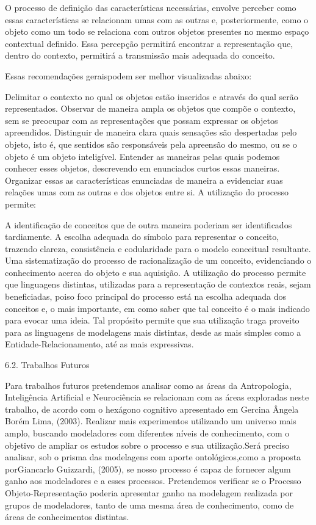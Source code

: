 O processo de definição das características necessárias, envolve perceber como essas características se relacionam umas com as outras e, posteriormente, como o objeto como um todo se relaciona com outros objetos presentes no mesmo espaço contextual definido. Essa percepção permitirá encontrar a representação que, dentro do contexto, permitirá a transmissão mais adequada do conceito.

Essas recomendações geraispodem ser melhor visualizadas abaixo:

Delimitar o contexto no qual os objetos estão inseridos e através do qual serão representados.
Observar de maneira ampla os objetos que compõe o contexto, sem se preocupar com as representações que possam expressar os objetos apreendidos.
Distinguir de maneira clara quais sensações são despertadas pelo objeto, isto é, que sentidos são responsáveis pela apreensão do mesmo, ou se o objeto é um objeto inteligível.
Entender as maneiras pelas quais podemos conhecer esses objetos, descrevendo em enunciados curtos essas maneiras.
Organizar essas as características enunciadas de maneira a evidenciar suas relações umas com as outras e dos objetos entre si.
A utilização do processo permite:

A identificação de conceitos que de outra maneira poderiam ser identificados tardiamente.
A escolha adequada do símbolo para representar o conceito, trazendo clareza, consistência e codularidade para o modelo conceitual resultante.
Uma sistematização do processo de racionalização de um conceito, evidenciando o conhecimento acerca do objeto e sua aquisição.
A utilização do processo permite que linguagens distintas, utilizadas para a representação de contextos reais, sejam beneficiadas, poiso foco principal do processo está na escolha adequada dos conceitos e, o mais importante, em como saber que tal conceito é o mais indicado para evocar uma ideia. Tal propósito permite que sua utilização traga proveito para as linguagens de modelagens mais distintas, desde as mais simples como a Entidade-Relacionamento, até as mais expressivas.

6.2. Trabalhos Futuros

Para trabalhos futuros pretendemos analisar como as áreas da Antropologia, Inteligência Artificial e Neurociência se relacionam com as áreas exploradas neste trabalho, de acordo com o hexágono cognitivo apresentado em Gercina Ângela Borém Lima, (2003). Realizar mais experimentos utilizando um universo mais amplo, buscando modeladores com diferentes níveis de conhecimento, com o objetivo de ampliar os estudos sobre o processo e sua utilização.Será preciso analisar, sob o prisma das modelagens com aporte ontológicos,como a proposta porGiancarlo Guizzardi, (2005), se nosso processo é capaz de fornecer algum ganho aos modeladores e a esses processos. Pretendemos verificar se o Processo Objeto-Representação poderia apresentar ganho na modelagem realizada por grupos de modeladores, tanto de uma mesma área de conhecimento, como de áreas de conhecimentos distintas.


